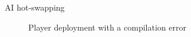 \documentclass{beamer}
\begin{document}
\begin{frame}{AI hot-swapping}
\begin{figure}[H]
\caption{Player deployment with a compilation error}
\end{figure}
\end{frame}
\end{document}
